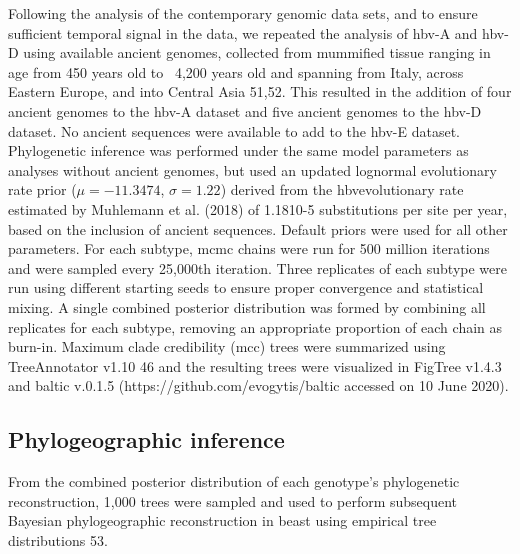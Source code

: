Following the analysis of the contemporary genomic data sets, and to ensure sufficient temporal signal in the data, we repeated the analysis of \gls{hbv}-A and \gls{hbv}-D using available ancient genomes, collected from mummified tissue ranging in age from 450 years old to ~4,200 years old and spanning from Italy, across Eastern Europe, and into Central Asia 51,52. This resulted in the addition of four ancient genomes to the \gls{hbv}-A dataset and five ancient genomes to the \gls{hbv}-D dataset. No ancient sequences were available to add to the \gls{hbv}-E dataset. Phylogenetic inference was performed under the same model parameters as analyses without ancient genomes, but used an updated lognormal evolutionary rate prior ($\mu=-11.3474$, $\sigma=1.22$) derived from the \gls{hbv}evolutionary rate estimated by Muhlemann et al. (2018) of 1.1810-5 substitutions per site per year, based on the inclusion of ancient sequences. Default priors were used for all other parameters. For each subtype, \gls{mcmc} chains were run for 500 million iterations and were sampled every 25,000th iteration. Three replicates of each subtype were run using different starting seeds to ensure proper convergence and statistical mixing. A single combined posterior distribution was formed by combining all replicates for each subtype, removing an appropriate proportion of each chain as burn-in. Maximum clade credibility (\gls{mcc}) trees were summarized using TreeAnnotator v1.10 46 and the resulting trees were visualized in FigTree v1.4.3 and baltic v.0.1.5 (https://github.com/evogytis/baltic accessed on 10 June 2020).

\subsection{Phylogeographic inference}
From the combined posterior distribution of each genotype's phylogenetic reconstruction, 1,000 trees were sampled and used to perform subsequent Bayesian phylogeographic reconstruction in \gls{beast} using empirical tree distributions 53.\\

